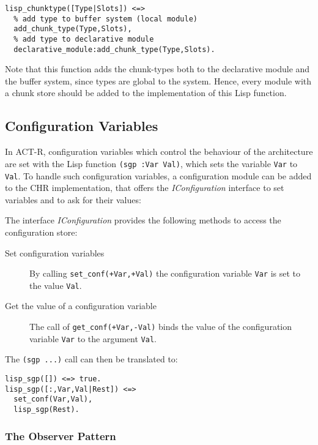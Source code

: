 \begin{lstlisting}
lisp_chunktype([Type|Slots]) <=>
  % add type to buffer system (local module)
  add_chunk_type(Type,Slots),
  % add type to declarative module
  declarative_module:add_chunk_type(Type,Slots).
\end{lstlisting}

Note that this function adds the chunk-types both to the declarative module and the buffer system, since types are global to the system. Hence, every module with a chunk store should be added to the implementation of this Lisp function.

\subsection{Configuration Variables}
\label{configuration}

In ACT-R, configuration variables which control the behaviour of the architecture are set with the Lisp function \lstinline|(sgp :Var Val)|, which sets the variable \lstinline|Var| to \lstinline|Val|. To handle such configuration variables, a configuration module can be added to the CHR implementation, that offers the \emph{IConfiguration} interface to set variables and to ask for their values:

\begin{definition}[IConfiguration]
\label{def:iconfiguration}
The interface \emph{IConfiguration} provides the following methods to access the configuration store:
\begin{description}
 \item[Set configuration variables] By calling \lstinline|set_conf(+Var,+Val)| the configuration variable \lstinline|Var| is set to the value \lstinline|Val|.
 \item[Get the value of a configuration variable] The call of \lstinline|get_conf(+Var,-Val)| binds the value of the configuration variable \lstinline|Var| to the argument \lstinline|Val|.
\end{description}
\end{definition}

The \lstinline|(sgp ...)| call can then be translated to:

\begin{lstlisting}
lisp_sgp([]) <=> true.
lisp_sgp([:,Var,Val|Rest]) <=>
  set_conf(Var,Val),
  lisp_sgp(Rest).
\end{lstlisting}

\subsubsection{The Observer Pattern}

